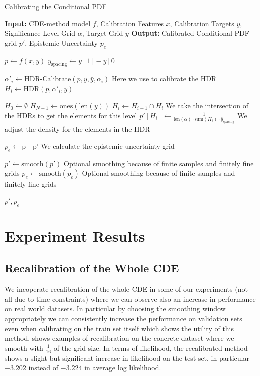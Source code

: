 \begin{algorithm}
    \caption{Calibrating the Conditional PDF}
    \label{alg:calibrate_pdf}
    \begin{algorithmic}
        \STATE \textbf{Input:} CDE-method model $f$, Calibration Features $x$, Calibration Targets $y$, Significance Level Grid $\alpha$, Target Grid $\bar{y}$
        \STATE \textbf{Output:} Calibrated Conditional PDF grid $p'$, Epistemic Uncertainty $p_e$

        \STATE $p \leftarrow f(x, \bar{y})$
        \STATE $\bar{y}_{\text{spacing}} \leftarrow \bar{y}[1] - \bar{y}[0]$

        \STATE $\alpha'_i \leftarrow \text{HDR-Calibrate}(p, y, \bar{y}, \alpha_i)$ Here we use  to calibrate the HDR
        \STATE $H_i \leftarrow \text{HDR}(p, \alpha'_i, \bar{y})$
        \ENDFOR

        \STATE $H_0 \leftarrow \emptyset$
        \STATE $H_{N+1} \leftarrow \text{ones}(\text{len}(\bar{y}))$
        \STATE $H_i \leftarrow H_{i - 1} \cap H_i$ We take the intersection of the HDRs to get the elements for this level
        \STATE $p'[H_i] \leftarrow \frac{1}{\text{len}(\alpha) \cdot \text{sum}(H_i) \cdot \bar{y}_{\text{spacing}}}$ We adjust the density for the elements in the HDR
        \ENDFOR

        \STATE $p_e \leftarrow \text{p - p'}$ We calculate the epistemic uncertainty grid

        \STATE $p' \leftarrow \text{smooth}(p')$ Optional smoothing because of finite samples and finitely fine grids
        \STATE $p_e \leftarrow \text{smooth}(p_e)$ Optional smoothing because of finite samples and finitely fine grids

        \RETURN $p', p_e$
    \end{algorithmic}
\end{algorithm}

\section{Experiment Results} \label{sec:results}

\subsection{Recalibration of the Whole CDE}

We incoperate recalibration of the whole CDE in some of our experiments (not all due to time-constraints) where we can observe also an increase in performance on real world datasets. In particular by choosing the smoothing window appropriately we can consistently increase the performance on validation sets even when calibrating on the train set itself which shows the utility of this method.  shows examples of recalibration on the concrete dataset where we smooth with $\frac{1}{16}$ of the grid size. In terms of likelihood, the recalibrated method shows a slight but significant increase in likelihood on the test set, in particular $-3.202$ instead of $-3.224$ in average log likelihood. %


